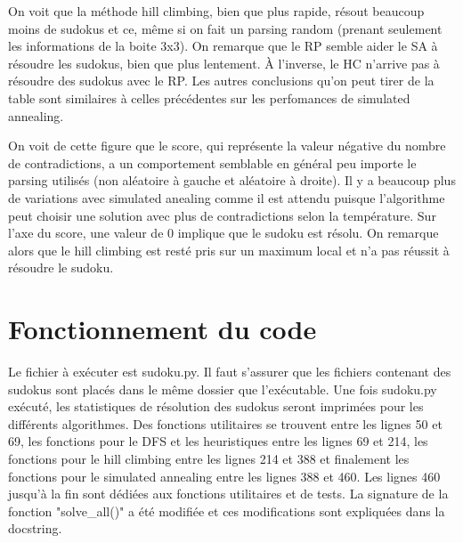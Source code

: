 \documentclass[8pt]{article}
\begin{document}
On voit que la méthode hill climbing, bien que plus rapide, résout beaucoup
moins de sudokus et ce, même si on fait un parsing random
(prenant seulement les informations de la boite 3x3). On remarque que le RP
semble aider le SA à résoudre les sudokus, bien que plus lentement. À
l'inverse, le HC n'arrive pas à résoudre des sudokus avec le RP. Les autres
conclusions qu'on peut tirer de la table sont similaires à celles précédentes
sur les perfomances de simulated annealing.

\begin{figure}[h]
	\centering
	\label{fig:foobar}
\end{figure}
\vspace{-20pt}

On voit de cette figure que le score, qui représente la valeur négative du
nombre de contradictions, a un comportement semblable
en général peu importe le parsing utilisés (non aléatoire à gauche et
aléatoire à droite). Il y a beaucoup plus de variations avec simulated
anealing comme il est attendu puisque l'algorithme peut choisir une solution
avec plus de contradictions selon la température. Sur l'axe du score, une valeur de
0 implique que le sudoku est résolu. On remarque alors que le hill climbing est
resté pris sur un maximum local et n'a pas réussit à résoudre le sudoku.

\section{Fonctionnement du code}
Le fichier à exécuter est sudoku.py. Il faut s'assurer que les fichiers
contenant des sudokus sont placés dans le même dossier que l'exécutable. Une
fois sudoku.py exécuté, les statistiques de résolution des sudokus seront
imprimées pour les différents algorithmes. Des fonctions utilitaires se trouvent
entre les lignes 50 et 69, les fonctions pour le DFS et les heuristiques entre
les lignes 69 et 214, les fonctions pour le hill climbing entre les lignes 214
et 388 et finalement les fonctions pour le simulated annealing entre les lignes
388 et 460. Les lignes 460 jusqu'à la fin sont dédiées aux fonctions utilitaires
et de tests. La signature de la fonction "solve\_all()" a été modifiée et ces
modifications sont expliquées dans la docstring.


\pagebreak{}\printbibliography[heading=bibintoc]
\end{document}
